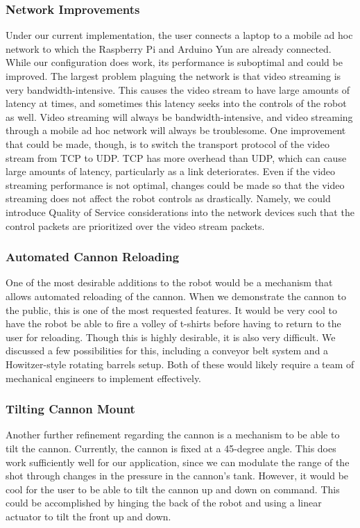 \documentclass[letterpaper,12pt]{article}
\begin{document}
\subsubsection{Network Improvements}
Under our current implementation, the user connects a laptop to a mobile ad hoc
network to which the Raspberry Pi and Arduino Yun are already connected. While
our configuration does work, its performance is suboptimal and could be
improved. The largest problem plaguing the network is that video streaming is
very bandwidth-intensive. This causes the video stream to have large amounts of
latency at times, and sometimes this latency seeks into the controls of the
robot as well. Video streaming will always be bandwidth-intensive, and video
streaming through a mobile ad hoc network will always be troublesome. One
improvement that could be made, though, is to switch the transport protocol of
the video stream from TCP to UDP. TCP has more overhead than UDP, which can
cause large amounts of latency, particularly as a link deteriorates. Even if the
video streaming performance is not optimal, changes could be made so that the
video streaming does not affect the robot controls as drastically. Namely, we
could introduce Quality of Service considerations into the network devices such
that the control packets are prioritized over the video stream packets.

\subsubsection{Automated Cannon Reloading}
One of the most desirable additions to the robot would be a mechanism that
allows automated reloading of the cannon. When we demonstrate the cannon to the
public, this is one of the most requested features. It would be very cool to
have the robot be able to fire a volley of t-shirts before having to return to
the user for reloading. Though this is highly desirable, it is also very
difficult. We discussed a few possibilities for this, including a conveyor belt
system and a Howitzer-style rotating barrels setup. Both of these would likely
require a team of mechanical engineers to implement effectively.

\subsubsection{Tilting Cannon Mount}
Another further refinement regarding the cannon is a mechanism to be able to
tilt the cannon. Currently, the cannon is fixed at a 45-degree angle. This does
work sufficiently well for our application, since we can modulate the range of
the shot through changes in the pressure in the cannon's tank. However, it would
be cool for the user to be able to tilt the cannon up and down on command. This
could be accomplished by hinging the back of the robot and using a linear
actuator to tilt the front up and down.
\end{document}
